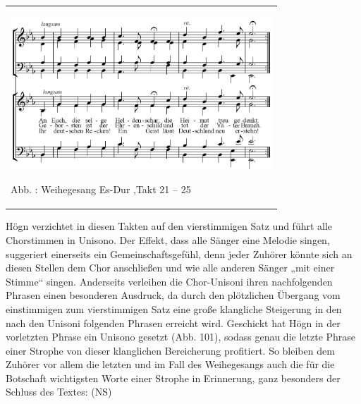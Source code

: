 \begin{center}
\tablefirsthead{}
\tablehead{}
\tabletail{}
\tablelasttail{}
\begin{supertabular}{m{10.009cm}}

\includegraphics[width=9.827cm,height=5.713cm]{pictures/zulassungsarbeit-img103.png}

\label{bkm:Ref100248086}Abb. : Weihegesang
Es-Dur ,Takt 21 – 25\\
\end{supertabular}
\end{center}
Högn verzichtet in diesen Takten auf den vierstimmigen Satz und führt
alle Chorstimmen in Unisono. Der Effekt, dass alle Sänger eine Melodie
singen, suggeriert einerseits ein Gemeinschaftsgefühl, denn jeder
Zuhörer könnte sich an diesen Stellen dem Chor anschließen und wie alle
anderen Sänger „mit einer Stimme“ singen. Anderseits verleihen die
Chor-Unisoni ihren nachfolgenden Phrasen einen besonderen Ausdruck, da
durch den plötzlichen Übergang vom einstimmigen zum vierstimmigen Satz
eine große klangliche Steigerung in den nach den Unisoni folgenden
Phrasen erreicht wird. Geschickt hat Högn in der vorletzten Phrase ein
Unisono gesetzt (Abb. 101), sodass genau die letzte Phrase einer
Strophe von dieser klanglichen Bereicherung profitiert. So bleiben dem
Zuhörer vor allem die letzten und im Fall des Weihegesangs auch die für
die Botschaft wichtigsten Worte einer Strophe in Erinnerung, ganz
besonders der Schluss des Textes: (NS)